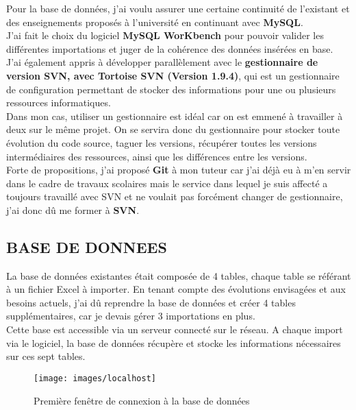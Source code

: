 Pour la base de données, j’ai voulu assurer une certaine continuité de l’existant et des enseignements proposés à l’université en continuant avec \textbf{MySQL}.\\

J’ai fait le choix du logiciel \textbf{MySQL WorKbench} pour pouvoir valider les différentes importations et juger de la cohérence des données insérées en base.\\

J’ai également appris à développer parallèlement avec le \textbf{gestionnaire de version SVN, avec Tortoise SVN (Version 1.9.4)}, qui est un gestionnaire de configuration permettant de stocker des informations pour une ou plusieurs ressources informatiques.\\

Dans mon cas, utiliser un gestionnaire est idéal car on est emmené à travailler à deux sur le même projet. On se servira donc du gestionnaire pour stocker toute évolution du code source, taguer les versions, récupérer toutes les versions intermédiaires des ressources, ainsi que les différences entre les versions.\\

Forte de propositions, j’ai proposé \textbf{Git} à mon tuteur car j’ai déjà eu à m’en servir dans le cadre de travaux scolaires mais le service dans lequel je suis affecté a toujours travaillé avec SVN et ne voulait pas forcément changer de gestionnaire, j’ai donc dû me former à \textbf{SVN}.\\  

\subsection{BASE DE DONNEES}

La base de données existantes était composée de 4 tables, chaque table se référant à un fichier Excel à importer.
En tenant compte des évolutions envisagées et aux besoins actuels, j’ai dû reprendre la base de données et créer 4 tables supplémentaires, car je devais gérer 3 importations en plus.\\

Cette base est accessible via un serveur connecté sur le réseau. A chaque import via le logiciel, la base de données récupère et stocke les informations nécessaires sur ces sept tables.\\


\begin{figure}[!h]
\begin{center}
\texttt{[image: images/localhost]}
\end{center}
\caption{Première fenêtre de connexion à la base de données}
\end{figure}

